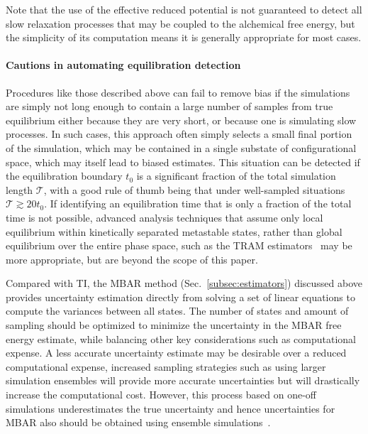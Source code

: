 Note that the use of the effective reduced potential is not guaranteed to detect all slow relaxation processes that may be coupled to the alchemical free energy, but the simplicity of its computation means it is generally appropriate for most cases.

\paragraph{Cautions in automating equilibration detection}

Procedures like those described above can fail to remove bias if the simulations are simply not long enough to contain a large number of samples from true equilibrium either because they are very short, or because one is simulating slow processes. In such cases, this approach often simply selects a small final portion of the simulation, which may be contained in a single substate of configurational space, which may itself lead to biased estimates. 
This situation can be detected if the equilibration boundary $t_0$ is a significant fraction of the total simulation length $\mathcal{T}$, with a good rule of thumb being that under well-sampled situations $\mathcal{T} \gtrsim 20 t_0$.
If identifying an equilibration time that is only a fraction of the total time is not possible, advanced analysis techniques that assume only local equilibrium within kinetically separated metastable states, rather than global equilibrium over the entire phase space, such as the TRAM estimators~\cite{mey2014xtram,wu2016multiensemble,nuske2017markov} may be more appropriate, but are beyond the scope of this paper.


Compared with TI, the MBAR method (Sec.~\ref{subsec:estimators}) discussed above provides uncertainty estimation directly from solving a set of linear equations to compute the variances between all states. 
The number of states and amount of sampling should be optimized to minimize the uncertainty in the MBAR free energy estimate, while balancing other key considerations such as computational expense. 
A less accurate uncertainty estimate may be desirable over a reduced computational expense, increased sampling strategies such as using larger simulation ensembles will provide more accurate uncertainties but will drastically increase the computational cost. 
However, this process based on one-off simulations underestimates the true uncertainty and hence uncertainties for MBAR also should be obtained using ensemble simulations~\cite{bhati2018, wade2022}.


